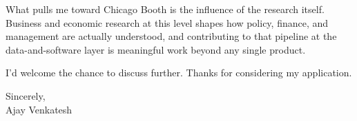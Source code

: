 \documentclass[letterpaper,11pt]{article}
\begin{document}
What pulls me toward Chicago Booth is the influence of the research itself. Business and economic research at this level shapes how policy, finance, and management are actually understood, and contributing to that pipeline at the data-and-software layer is meaningful work beyond any single product.

I'd welcome the chance to discuss further. Thanks for considering my application.

\vspace{12pt}
Sincerely, \\
Ajay Venkatesh
\end{document}
